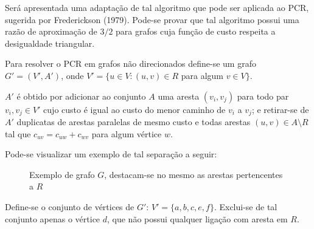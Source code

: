         Será apresentada uma adaptação de tal algoritmo que pode ser aplicada ao PCR, sugerida por Frederickson (1979).
        Pode-se provar que tal algoritmo possui uma razão de aproximação de $3/2$ para grafos cuja função de custo respeita a desigualdade triangular. 

        Para resolver o PCR em grafos não direcionados define-se um grafo $G' = (V', A')$, onde $V' = \{ u \in V : (u, v) \in R$ para algum $v \in V\}$.

        $A'$ é obtido por adicionar ao conjunto $A$ uma aresta $(v_i, v_j)$ para todo par $v_i, v_j \in V'$ cujo custo é igual ao custo do menor caminho de $v_i$ a $v_j$; e retirar-se de $A'$ duplicatas de arestas paralelas de mesmo custo e todas arestas $(u, v) \in A \setminus R$ tal que $c_{uv} = c_{uw} + c_{wv}$ para algum vértice $w$.

        Pode-se visualizar um exemplo de tal separação a seguir:


        \begin{figure}[H]
            \centering
            \caption{Exemplo de grafo $G$, destacam-se no mesmo as arestas pertencentes a $R$}
            \label{grafo-original}
        \end{figure}

        Define-se o conjunto de vértices de $G'$: $V' = \{a, b, c, e, f\}$.
        Exclui-se de tal conjunto apenas o vértice $d$, que não possui qualquer ligação com aresta em $R$.

